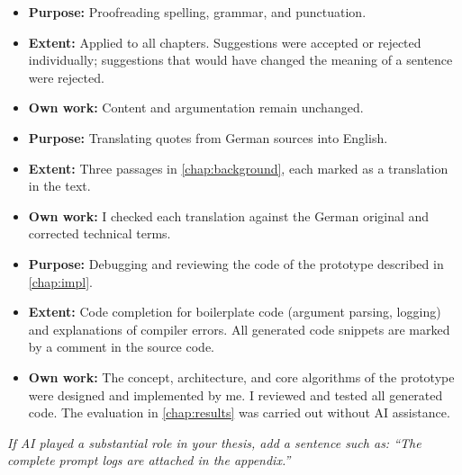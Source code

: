 \begin{itemize}
    \item \textbf{Purpose:} Proofreading spelling, grammar, and punctuation.
    \item \textbf{Extent:} Applied to all chapters. Suggestions were accepted or rejected individually; suggestions that would have changed the meaning of a sentence were rejected.
    \item \textbf{Own work:} Content and argumentation remain unchanged.
\end{itemize}

\begin{itemize}
    \item \textbf{Purpose:} Translating quotes from German sources into English.
    \item \textbf{Extent:} Three passages in \autoref{chap:background}, each marked as a translation in the text.
    \item \textbf{Own work:} I checked each translation against the German original and corrected technical terms.
\end{itemize}

\begin{itemize}
    \item \textbf{Purpose:} Debugging and reviewing the code of the prototype described in \autoref{chap:impl}.
    \item \textbf{Extent:} Code completion for boilerplate code (argument parsing, logging) and explanations of compiler errors. All generated code snippets are marked by a comment in the source code.
    \item \textbf{Own work:} The concept, architecture, and core algorithms of the prototype were designed and implemented by me. I reviewed and tested all generated code. The evaluation in \autoref{chap:results} was carried out without AI assistance.
\end{itemize}

\emph{If AI played a substantial role in your thesis, add a sentence such as: \enquote{The complete prompt logs are attached in the appendix.}}
